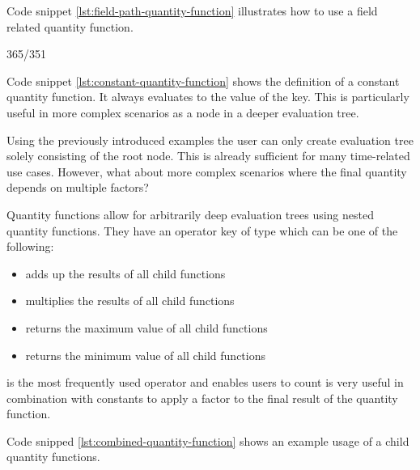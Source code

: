 Code snippet \ref{lst:field-path-quantity-function} illustrates how to use a field related quantity function.


365/351




Code snippet \ref{lst:constant-quantity-function} shows the definition of a constant quantity function.
It always evaluates to the value of the  key.
This is particularly useful in more complex scenarios as a node in a deeper evaluation tree.



Using the previously introduced examples the user can only create evaluation tree solely consisting of the root node.
This is already sufficient for many time-related use cases.
However, what about more complex scenarios where the final quantity depends on multiple factors?

Quantity functions allow for arbitrarily deep evaluation trees using nested quantity functions.
They have an operator key of type  which can be one of the following:
\begin{itemize}
    \item {} adds up the results of all child functions
    \item {} multiplies the results of all child functions
    \item {} returns the maximum value of all child functions
    \item {} returns the minimum value of all child functions
\end{itemize}

 is the most frequently used operator and enables users to count
 is very useful in combination with constants to apply a factor to the final result of the quantity function.

Code snipped \ref{lst:combined-quantity-function} shows an example usage of a child quantity functions.



